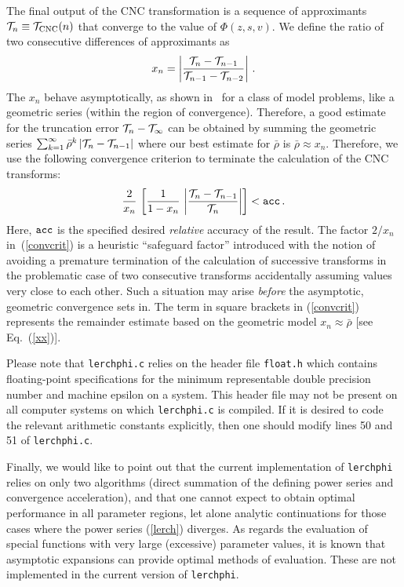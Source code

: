 \documentclass[11pt]{article}
\begin{document}
The final output of the CNC transformation is a sequence
of approximants ${\cal T}_n \equiv {\cal T}_{\rm CNC}(n)$ that converge
to the value of $\Phi(z,s,v)$. We define the ratio of two
consecutive differences of approximants as
%
\begin{equation}
\label{xx}
x_n = \left| \frac{{\cal T}_{n} - {\cal T}_{n-1}}
  {{\cal T}_{n-1} - {\cal T}_{n-2}} \right|\,.
\end{equation}
%
The $x_n$ behave asymptotically, as shown in~\cite{JeBeSoAkSaMo2002} for a 
class of model problems, like 
a geometric series (within the region of convergence). 
Therefore, a good estimate for the truncation error 
${\cal T}_{n} - {\cal T}_\infty$ can be obtained
by summing the geometric series 
$\sum_{k=1}^\infty {\bar \rho}^k \, 
|{\cal T}_{n} - {\cal T}_{n-1}|$ where our best 
estimate for $\bar \rho$ is $\bar \rho \approx x_n$.
Therefore, we use the following convergence criterion to terminate 
the calculation of the CNC transforms:
%
\begin{equation}
\label{convcrit}
\frac{2}{x_n} \, \left[ \frac{1}{1-x_n} \,
\left| \frac{{\cal T}_{n} - {\cal T}_{n-1}}{{\cal T}_{n}} \right| \right] < 
{\tt acc}\,.
\end{equation}
%
Here, ${\tt acc}$ is the specified desired {\em relative} 
accuracy of the result. The factor $2/x_n$ in~(\ref{convcrit})
is a heuristic ``safeguard factor'' introduced with the 
notion of avoiding a premature termination of the calculation
of successive transforms in the problematic case of
two consecutive transforms accidentally assuming values
very close to each other. Such a situation may arise {\em before}
the asymptotic, geometric convergence sets in.
The term in square brackets in (\ref{convcrit}) represents 
the remainder estimate based on the geometric model $x_n \approx \bar \rho$
[see Eq.~(\ref{xx})].

Please note that {\tt lerchphi.c} relies on the header file 
{\tt float.h} which contains 
floating-point specifications for the minimum representable 
double precision number and machine epsilon on a system.  
This header file may not be present on all computer systems
on which {\tt lerchphi.c} is compiled.
If it is desired to code the relevant arithmetic constants
explicitly, then one should modify lines 50 and 51
of {\tt lerchphi.c}.

Finally, we would like to point out that the current
implementation of {\tt lerchphi} relies on only two 
algorithms (direct summation of the defining power series
and convergence acceleration), and that one cannot expect to 
obtain optimal performance in all parameter regions, let alone
analytic continuations for those cases where the power series
(\ref{lerch}) diverges. As regards the evaluation
of special functions with very large (excessive)
parameter values, it is known that asymptotic expansions can
provide optimal methods of evaluation. These are not implemented
in the current version of {\tt lerchphi}. 
\end{document}
